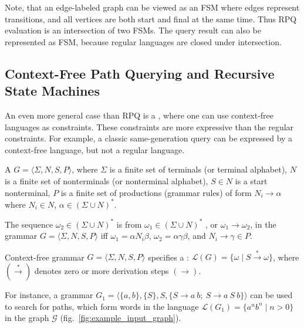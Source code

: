 Note, that an edge-labeled graph can be viewed as an FSM where edges represent transitions, and all vertices are both start and final at the same time.
Thus RPQ evaluation is an intersection of two FSMs.
The query result can also be represented as FSM, because regular languages are closed under intersection.

\subsection{Context-Free Path Querying and Recursive State Machines}

An even more general case than RPQ is a , where one can use context-free languages as constraints.
These constraints are more expressive than the regular constraints.
For example, a classic same-generation query can be expressed by a context-free language, but not a regular language.

\begin{definition}
A  $G = \langle\Sigma, N, S, P\rangle$, where $\Sigma$ is a finite set of terminals (or terminal alphabet), $N$ is a finite set of nonterminals (or nonterminal alphabet), $S \in N$ is a start nonterminal, $P$ is a finite set of productions (grammar rules) of form $N_i \to \alpha$ where  $N_i \in N$, $\alpha \in (\Sigma \cup N)^*$.
\end{definition}

\begin{definition}
The sequence $\omega_2 \in (\Sigma \cup N)^*$ is  from $\omega_1 \in (\Sigma \cup N)^*$ , or $\omega_1 \to \omega_2$, in the grammar $G = \langle\Sigma, N, S, P\rangle$ iff $\omega_1=\alpha N_i \beta$, $\omega_2 = \alpha \gamma \beta$, and $N_i \to \gamma \in P$.
\end{definition}

\begin{definition}
Context-free grammar $G=\langle\Sigma, N, S, P\rangle$ specifies a : $\mathcal{L}(G) = \{\omega \mid S \xrightarrow{*} \omega \}$, where $(\xrightarrow{*})$ denotes zero or more derivation steps $(\to)$.
\end{definition}

For instance, a grammar $G_1 = \langle \{a,b\}, \{S\}, S, \{S \to a \ b; \ S \to a \ S \ b\} \rangle$ can be used to search for paths, which form words in the language $\mathcal{L}(G_1) = \{a^n b^n \mid n > 0\}$ in the graph $\mathcal{G}$ (fig.~\ref{fig:example_input_graph}).

